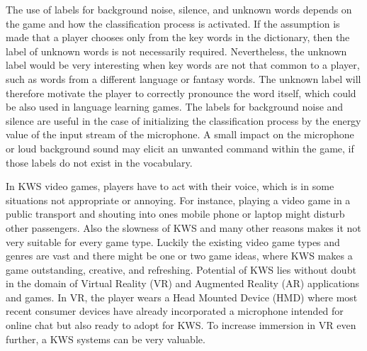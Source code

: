 The use of labels for background noise, silence, and unknown words depends on the game and how the classification process is activated.
If the assumption is made that a player chooses only from the key words in the dictionary, then the label of unknown words is not necessarily required.
Nevertheless, the unknown label would be very interesting when key words are not that common to a player, such as words from a different language or fantasy words.
The unknown label will therefore motivate the player to correctly pronounce the word itself, which could be also used in language learning games.
The labels for background noise and silence are useful in the case of initializing the classification process by the energy value of the input stream of the microphone.
A small impact on the microphone or loud background sound may elicit an unwanted command within the game, if those labels do not exist in the vocabulary.

In KWS video games, players have to act with their voice, which is in some situations not appropriate or annoying.
For instance, playing a video game in a public transport and shouting into ones mobile phone or laptop might disturb other passengers.
Also the slowness of KWS and many other reasons makes it not very suitable for every game type.
Luckily the existing video game types and genres are vast and there might be one or two game ideas, where KWS makes a game outstanding, creative, and refreshing.
Potential of KWS lies without doubt in the domain of Virtual Reality (VR) and Augmented Reality (AR) applications and games.
In VR, the player wears a Head Mounted Device (HMD) where most recent consumer devices have already incorporated a microphone intended for online chat but also ready to adopt for KWS.
To increase immersion in VR even further, a KWS systems can be very valuable.